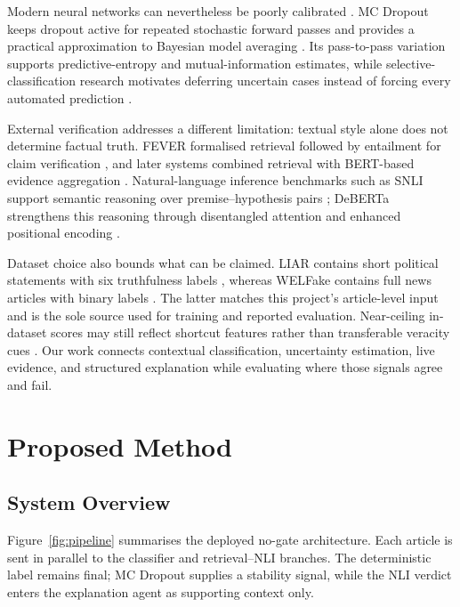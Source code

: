 \documentclass[10pt,twocolumn,letterpaper]{article}
\begin{document}
Modern neural networks can nevertheless be poorly calibrated
\cite{guo2017calibration}. MC Dropout keeps dropout active for repeated stochastic
forward passes and provides a practical approximation to Bayesian model averaging
\cite{gal2016dropout}. Its pass-to-pass variation supports predictive-entropy and
mutual-information estimates, while selective-classification research motivates
deferring uncertain cases instead of forcing every automated prediction
\cite{geifman2017selective}.

External verification addresses a different limitation: textual style alone does
not determine factual truth. FEVER formalised retrieval followed by entailment for
claim verification \cite{thorne-etal-2018-fever}, and later systems combined
retrieval with BERT-based evidence aggregation
\cite{hanselowski-etal-2018-ukp,soleimani-etal-2020-bert}. Natural-language
inference benchmarks such as SNLI support semantic reasoning over
premise--hypothesis pairs \cite{bowman2015snli}; DeBERTa strengthens this reasoning
through disentangled attention and enhanced positional encoding
\cite{he2021deberta}.

Dataset choice also bounds what can be claimed. LIAR contains short political
statements with six truthfulness labels \cite{wang2017liar}, whereas WELFake
contains full news articles with binary labels \cite{verma2021welfake}. The latter
matches this project's article-level input and is the sole source used for training
and reported evaluation. Near-ceiling in-dataset scores may still reflect shortcut
features rather than transferable veracity cues \cite{geirhos2020shortcut}. Our
work connects contextual classification, uncertainty estimation, live evidence,
and structured explanation while evaluating where those signals agree and fail.

\section{Proposed Method}
\subsection{System Overview}
Figure~\ref{fig:pipeline} summarises the deployed no-gate architecture. Each article
is sent in parallel to the classifier and retrieval--NLI branches. The deterministic
label remains final; MC Dropout supplies a stability signal, while the NLI verdict
enters the explanation agent as supporting context only.
\end{document}
